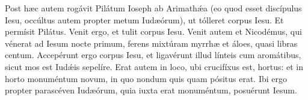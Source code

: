 Post hæc autem rogávit Pilátum Ioseph ab Arimathǽa (eo quod esset discípulus 
Iesu, occúltus autem propter metum Iudæórum), ut tólleret corpus Iesu.
Et permísit Pilátus. Venit ergo, et tulit corpus Iesu.
Venit autem et Nicodémus, qui vénerat ad Iesum nocte primum, ferens 
mixtúram myrrhæ et áloes, quasi libras centum. Accepérunt ergo corpus Iesu,
et ligavérunt illud línteis cum aromátibus, sicut mos est Iudǽis sepelíre.
Erat autem in loco, ubi crucifíxus est, hortus: et in horto monuméntum
novum, in quo nondum quis quam pósitus erat. Ibi ergo propter parascéven
Iudæórum, quia iuxta erat monuméntum, posuérunt Iesum.
